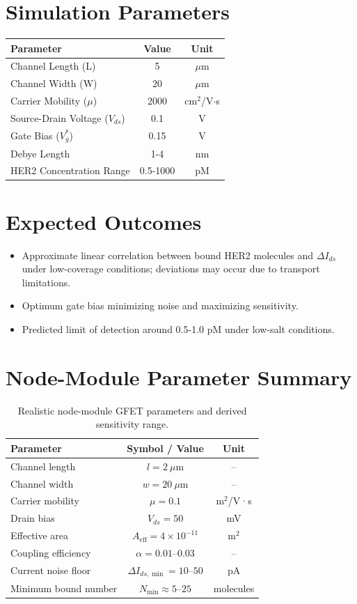 \documentclass[12pt,a4paper]{report}
\begin{document}
\section{Simulation Parameters}
\begin{center}
\begin{tabular}{|l|c|c|}
\hline
\textbf{Parameter} & \textbf{Value} & \textbf{Unit} \\
\hline
Channel Length (L) & 5 & $\mu$m \\
Channel Width (W) & 20 & $\mu$m \\
Carrier Mobility ($\mu$) & 2000 & cm$^2$/V$\cdot$s \\
Source-Drain Voltage ($V_{ds}$) & 0.1 & V \\
Gate Bias ($V_g^*$) & 0.15 & V \\
Debye Length & 1-4 & nm \\
HER2 Concentration Range & 0.5-1000 & pM \\
\hline
\end{tabular}
\end{center}

\section{Expected Outcomes}
\begin{itemize}
  \item Approximate linear correlation between bound HER2 molecules and $\Delta I_{ds}$ under low-coverage conditions; deviations may occur due to transport limitations.
  \item Optimum gate bias minimizing noise and maximizing sensitivity.
  \item Predicted limit of detection around 0.5-1.0 pM under low-salt conditions.
\end{itemize}

\section{Node-Module Parameter Summary}

\begin{table}[H]
\centering
\begin{tabular}{lcc}
\toprule
Parameter & Symbol / Value & Unit \\ \midrule
Channel length & $l = 2~\mu$m & -- \\
Channel width & $w = 20~\mu$m & -- \\
Carrier mobility & $\mu = 0.1$ & m$^2$/V·s \\
Drain bias & $V_{ds} = 50$ & mV \\
Effective area & $A_{\text{eff}} = 4\times10^{-11}$ & m$^2$ \\
Coupling efficiency & $\alpha = 0.01$--$0.03$ & -- \\
Current noise floor & $\Delta I_{ds,\min} = 10$--$50$ & pA \\
Minimum bound number & $N_{\min} \approx 5$--$25$ & molecules \\ \bottomrule
\end{tabular}
\caption{Realistic node-module GFET parameters and derived sensitivity range.}
\end{table}
\end{document}
